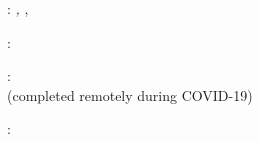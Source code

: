\thispagestyle{empty}

\hfill

\vfill

\noindent\myName: \textit{\myTitle,} \myDegree,
\textcopyright\ \myTime

\bigskip

\noindent{}: \\
\mySupervisor

\medskip

\noindent{}: \\
\myLocation (completed remotely during COVID-19)

\medskip

\noindent{}: \\
\myTimeFrame
